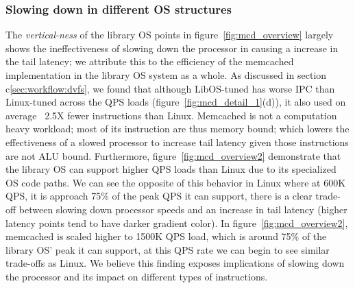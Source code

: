 \subsubsection{Slowing down in different OS structures } 
\label{sec:mcd:slowinos}
The \textit{vertical-ness} of the library OS points in figure~\ref{fig:mcd_overview} largely shows the ineffectiveness of slowing down the processor in causing a increase in the tail latency; we attribute this to the efficiency of the memcached implementation in the library OS system as a whole. As discussed in section c\ref{sec:workflow:dvfs}, we found that although LibOS-tuned has worse IPC than Linux-tuned across the QPS loads (figure~\ref{fig:mcd_detail_1}(d)), it also used on average ~2.5X fewer instructions than Linux. Memcached is not a computation heavy workload; most of its instruction are thus memory bound; which lowers the effectiveness of a slowed processor to increase tail latency given those instructions are not ALU bound. Furthermore, figure~\ref{fig:mcd_overview2} demonstrate that the library OS can support higher QPS loads than Linux due to its specialized OS code paths. We can see the opposite of this behavior in Linux where at 600K QPS, it is approach 75\% of the peak QPS it can support, there is a clear trade-off between slowing down processor speeds and an increase in tail latency (higher latency points tend to have darker gradient color). In figure~\ref{fig:mcd_overview2}, memcached is scaled higher to 1500K QPS load, which is around 75\% of the library OS' peak it can support, at this QPS rate we can begin to see similar trade-offs as Linux. We believe this finding exposes implications of slowing down the processor and its impact on different types of instructions.

